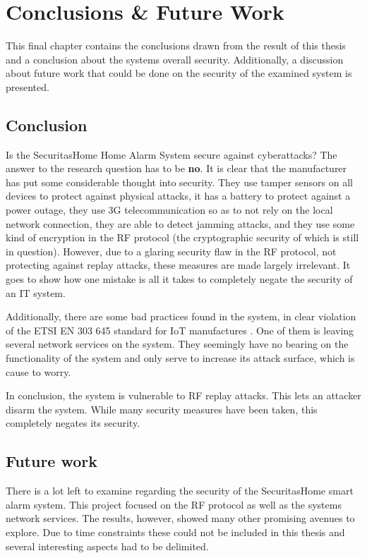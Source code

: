 \chapter{Conclusions \& Future Work} \label{ch:conclusion}
This final chapter contains the conclusions drawn from the result of this thesis and a conclusion about the systems overall security. Additionally, a discussion about future work that could be done on the security of the examined system is presented.

\section{Conclusion}
Is the SecuritasHome Home Alarm System secure against cyberattacks? The answer to the research question has to be \textbf{no}. It is clear that the manufacturer has put some considerable thought into security. They use tamper sensors on all devices to protect against physical attacks, it has a battery to protect against a power outage, they use 3G telecommunication so as to not rely on the local network connection, they are able to detect jamming attacks, and they use some kind of encryption in the RF protocol (the cryptographic security of which is still in question). However, due to a glaring security flaw in the RF protocol, not protecting against replay attacks, these measures are made largely irrelevant. It goes to show how one mistake is all it takes to completely negate the security of an IT system.

Additionally, there are some bad practices found in the system, in clear violation of the ETSI EN 303 645 standard for IoT manufactures \cite{etsi-iot-standard}. One of them is leaving several network services on the system. They seemingly have no bearing on the functionality of the system and only serve to increase its attack surface, which is cause to worry.

In conclusion, the system is vulnerable to RF replay attacks. This lets an attacker disarm the system. While many security measures have been taken, this completely negates its security.

\section{Future work} \label{ch:conclusion:related-work}
There is a lot left to examine regarding the security of the SecuritasHome smart alarm system. This project focused on the RF protocol as well as the systems network services. The results, however, showed many other promising avenues to explore. Due to time constraints these could not be included in this thesis and several interesting aspects had to be delimited.

